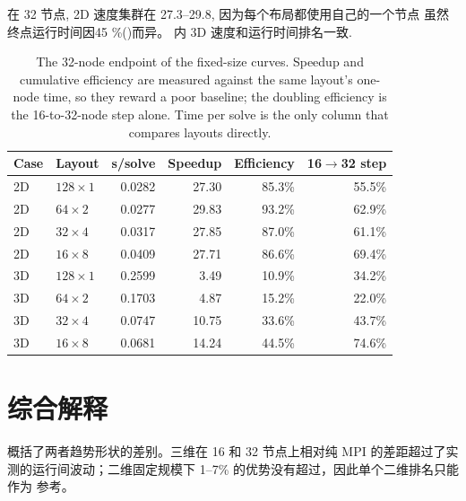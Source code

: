 \documentclass[11pt,a4paper,oneside]{report}
\begin{document}
在 32 节点, 2D 速度集群在 27.3--29.8, 因为每个布局都使用自己的一个节点
虽然终点运行时间因45 \%()而异。 内
3D 速度和运行时间排名一致.

\begin{table}[htbp]
  \centering
  \caption{The 32-node endpoint of the fixed-size curves. Speedup and cumulative
  efficiency are measured against the same layout's one-node time, so they reward a poor
  baseline; the doubling efficiency is the 16-to-32-node step alone. Time per solve is the
  only column that compares layouts directly.}
  \label{tab:strong20m-endpoints}
  \begin{tabular}{llrrrr}
    \toprule
    Case & Layout & s/solve & Speedup & Efficiency & 16$\to$32 step \\
    \midrule
    2D & $128\times1$ & 0.0282 & 27.30 & 85.3\% & 55.5\% \\
    2D & $64\times2$  & 0.0277 & 29.83 & 93.2\% & 62.9\% \\
    2D & $32\times4$  & 0.0317 & 27.85 & 87.0\% & 61.1\% \\
    2D & $16\times8$  & 0.0409 & 27.71 & 86.6\% & 69.4\% \\
    \addlinespace
    3D & $128\times1$ & 0.2599 &  3.49 & 10.9\% & 34.2\% \\
    3D & $64\times2$  & 0.1703 &  4.87 & 15.2\% & 22.0\% \\
    3D & $32\times4$  & 0.0747 & 10.75 & 33.6\% & 43.7\% \\
    3D & $16\times8$  & 0.0681 & 14.24 & 44.5\% & 74.6\% \\
    \bottomrule
  \end{tabular}
\end{table}

\section{综合解释}
\label{sec:mn-interp}
 概括了两者趋势形状的差别。三维在 16 和 32 节点上相对纯 MPI
的差距超过了实测的运行间波动；二维固定规模下 1--7\% 的优势没有超过，因此单个二维排名只能作为
参考。
\end{document}
